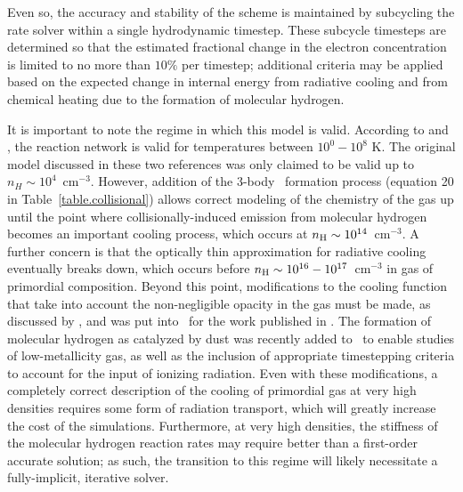 Even so, the accuracy and stability of the scheme is maintained by
subcycling the rate solver within a single hydrodynamic timestep.
These subcycle timesteps are determined so that the estimated
fractional change in the electron concentration is limited to no more
than $10\%$ per timestep; additional criteria may be applied based on
the expected change in internal energy from radiative cooling and from
chemical heating due to the formation of molecular hydrogen.

It is important to note the regime in which this model is valid.
According to \citet{abel97} and \citet{anninos97}, the reaction
network is valid for temperatures between $10^0 - 10^8$ K.  The
original model discussed in these two references was only claimed to
be valid up to $n_H \sim 10^4$~cm$^{-3}$.  However, addition of the
3-body \HH~formation process (equation 20 in
Table~\ref{table.collisional}) allows correct modeling of the
chemistry of the gas up until the point where collisionally-induced
emission from molecular hydrogen becomes an important cooling process,
which occurs at $n_{\rm H} \sim 10^{14}$~cm$^{-3}$.  A further concern
is that the optically thin approximation for radiative cooling
eventually breaks down, which occurs before $n_{\rm H} \sim 10^{16} -
10^{17}$~cm$^{-3}$ in gas of primordial composition.  Beyond this
point, modifications to the cooling function that take into account
the non-negligible opacity in the gas must be made, as discussed by
\citet{2004MNRAS.348.1019R}, and was put into \enzo\ for the work
published in \citep{2009Sci...325..601T,2009PhDT.........5T}.  The
formation of molecular hydrogen as catalyzed by dust was recently
added to \enzo\ to enable studies of low-metallicity gas, as well as
the inclusion of appropriate timestepping criteria to account for the
input of ionizing radiation.  Even with these modifications, a
completely correct description of the cooling of primordial gas at
very high densities requires some form of radiation transport, which
will greatly increase the cost of the simulations.  Furthermore, at
very high densities, the stiffness of the molecular hydrogen reaction
rates may require better than a first-order accurate solution; as
such, the transition to this regime will likely necessitate a
fully-implicit, iterative solver.


